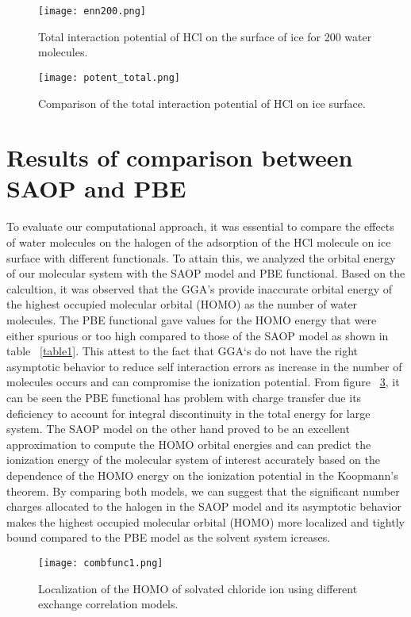 \documentclass[a4paper,11pt]{report}
\begin{document}
\begin{figure}[H]\large
\texttt{[image: enn200.png]}
\caption{Total interaction potential of HCl on the surface of ice for 200 water molecules.}
\label{figure102}
\end{figure}

\begin{figure}[H]\large
\texttt{[image: potent\_total.png]}
\caption{Comparison of the total interaction potential of HCl on ice surface.}
\label{figure103}
\end{figure}


\section{Results of comparison between SAOP and PBE}
To evaluate our computational approach, it was essential to compare the effects of water molecules on the halogen of the adsorption of  the HCl molecule on ice surface with different functionals. To attain this, we analyzed the orbital energy of our molecular system with the SAOP model and PBE functional. Based on the calcultion, it was observed that the GGA's provide inaccurate orbital energy of the highest occupied molecular orbital (HOMO) as the number of water molecules. The PBE functional gave values for the HOMO energy that were either spurious or too high compared to those of the SAOP model as shown in table ~\ref{table1}. This attest to the fact that GGA`s do not have the right asymptotic behavior to reduce self interaction errors as increase in the number of molecules occurs and can compromise the ionization potential. From figure ~\ref{figure0}, it can be seen the PBE functional has problem with charge transfer due its deficiency to account for integral discontinuity in the total energy for large system. The SAOP model on the other hand proved to be an excellent approximation to compute the HOMO orbital energies and can predict the ionization energy of the molecular system of interest accurately based on the dependence of the HOMO energy on the ionization potential in the Koopmann's theorem. By comparing both models, we can suggest that the significant number charges allocated to the halogen in the SAOP  model and its asymptotic behavior makes the highest occupied molecular orbital (HOMO) more localized and tightly bound compared to the PBE model as the solvent system icreases. 

\begin{figure}[H]\large
\texttt{[image: combfunc1.png]}
\caption{Localization of the HOMO of solvated chloride ion using different exchange correlation models.}
\label{figure0}
\end{figure}
\end{document}
